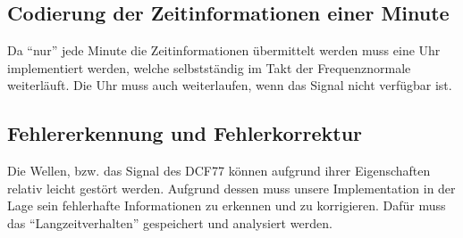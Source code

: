 \subsection{Codierung der Zeitinformationen einer Minute}
Da "`nur"' jede Minute die Zeitinformationen übermittelt werden muss eine Uhr implementiert werden, welche selbstständig im Takt der Frequenznormale weiterläuft. Die Uhr muss auch weiterlaufen, wenn das Signal nicht verfügbar ist.

\subsection{Fehlererkennung und Fehlerkorrektur}
Die Wellen, bzw. das Signal des DCF77 können aufgrund ihrer Eigenschaften relativ leicht gestört werden. Aufgrund dessen muss unsere Implementation in der Lage sein fehlerhafte Informationen zu erkennen und zu korrigieren. Dafür muss das "`Langzeitverhalten"' gespeichert und analysiert werden.

